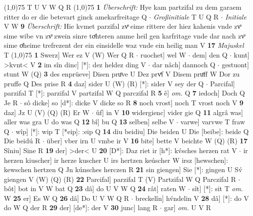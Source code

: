 \documentclass[8pt,a4paper,notitlepage]{article}
\begin{document}
\begin{table}[ht]
\begin{minipage}[t]{0.5\linewidth}
\scriptsize
\line(1,0){75} \newline
T U V W Q R \newline
\line(1,0){75} \newline
\textbf{1} \textit{Überschrift:} Hye kam partzifal zu dem garaem ritter do er die betevart ginck amekarfreitage Q   $\cdot$ \textit{Großinitiale} T U Q R   $\cdot$ \textit{Initiale} V W  \textbf{9} \textit{Überschrift:} Hie kvmet parzifal zvͦ eime rittere der hiez kahenis vnde zvͦ sime wibe vn zvͦ zwein sinre toͤhteren amme heil gen karfritage vnde dar nach zvͦ sime oͤheime trefrezent der ein einsidelle waz vnde ein heilig man V  \textbf{17} \textit{Majuskel} T  \newline
\line(1,0){75} \newline
\textbf{1} Swerz] Wer ez V (W) Wer Q R  $\cdot$ ruochet] wel W  $\cdot$ dem] den Q  $\cdot$ kunt] >kvnt< V \textbf{2} im sîn dinc] [*]: dez heldez ding V  $\cdot$ dar nâch] dannoch Q  $\cdot$ gestuont] stunt W (Q) \textbf{3} des enprüeve] Disen pruͦve U Dez prvͤf V Disem pruͤff W Dor zu pruffe Q Des prise R \textbf{4} daz] sider U (W) (R) [*]: sider  V sey der Q  $\cdot$ Parcifal] parzifal T [*]: parzifal V partzifal W Q parczifal R \textbf{5} ê] \textit{om.} Q \textbf{7} iedoch] Doch Q Je R  $\cdot$ sô dicke] so [d*]: dicke V dicke so R \textbf{8} noch vrost] noch T vrost noch V \textbf{9} daz] Jz U (V) (Q) (R) Er W  $\cdot$ ûf] in V \textbf{10} widergienc] vider gie Q \textbf{11} algrâ was] aller was gra U do was Q \textbf{12} bî] bu Q \textbf{13} selben] selbe V  $\cdot$ varwe] varvwe T fraw Q  $\cdot$ wîp] [*]: wip T [*eip]: :eip Q \textbf{14} diu beidiu] Die beiden U Die [beibe]: beide Q Die beidú R  $\cdot$ über] vber irn U vmbe ir V \textbf{16} bite] bette V beichte W (Q) (R) \textbf{17} Sîniu] Sine R \textbf{19} der] >der< U \textbf{20} [D*]: Daz riet ir [h*]: kv́sches herzen rat V  $\cdot$ ir herzen kiuscher] ir herze kuscher U irs hertzen keúscher W irsz [hewschen]: kewschen hertzen Q Jn kúnsches herczen R \textbf{21} sin giengen] Sie [*]: gingen U Sv́ giengen V (W) (Q) (R) \textbf{22} Parcifal] parzifal T (V) Partzifal W Q Parczifal R  $\cdot$ bôt] bot in V W bat Q \textbf{23} dâ] do U V W Q \textbf{24} rât] raten W  $\cdot$ sît] [*]: sit T \textit{om.} W \textbf{25} er] Es W Q \textbf{26} dâ] Do U V W Q R  $\cdot$ breckelîn] hv́ndelin V \textbf{28} dâ] [*]: do V do W Q der R \textbf{29} der] [de*]: der V \textbf{30} junc] lang R  $\cdot$ gar] \textit{om.} U V R \newline
\end{minipage}
\end{table}
\end{document}

